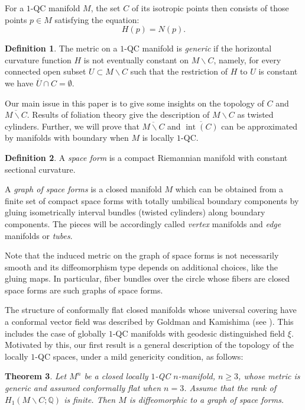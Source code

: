 \documentclass[JEP,XML,SOM,Unicode]{cedram}
\let\moins\smallsetminus
\DeclareMathOperator{\inte}{int}
\newtheorem{theorem}{Theorem}[section]
\theoremstyle{definition}
\newtheorem{definition}[theorem]{Definition}
\theoremstyle{remark}
\numberwithin{equation}{section}
\begin{document}
For a $1$-QC manifold $M$, the set $C$ of its isotropic points
then consists of those points $p\in M$ satisfying the equation:
\[ H(p)=N(p).\]

\begin{definition}\label{generic}
The metric on a $1$-QC manifold is \emph{generic} if the horizontal curvature function $H$
is not eventually constant on $M\moins C$, namely, for every
connected open subset $U\subset M\moins C$ such that the restriction of $H$ to $U$ is constant
we have $\overline{U}\cap C=\emptyset$.
\end{definition}

Our main issue in this paper is to give some insights on the topology of $C$
and $\overline{M\moins C}$. Results of foliation theory give the description of $M\moins C$ as twisted cylinders.
Further, we will prove that $\overline{M\moins C}$
and $\overline{\inte (C)}$ can be approximated by manifolds with boundary when
$M$ is locally $1$-QC.

\begin{definition}
A \emph{space form} is a compact Riemannian manifold with constant sectional curvature.

A \emph{graph of space forms} is a closed manifold $M$ which can be obtained
from a finite set of compact space forms with totally umbilical
boundary components by gluing isometrically
interval bundles (twisted cylinders) along boundary components.
The pieces will be accordingly called \emph{vertex} manifolds and \emph{edge}
manifolds or \emph{tubes}.
\end{definition}

Note that the induced metric on the graph of space forms is not necessarily smooth and its
diffeomorphism type depends on additional choices, like the gluing maps.
In particular, fiber bundles over the circle whose fibers are closed space forms
are such graphs of space forms.

The structure of conformally flat closed manifolds whose universal covering
have a conformal vector field was described by Goldman and Kamishima (see \cite{Go-Kam}).
This includes the case of globally $1$-QC manifolds with geodesic distinguished field $\xi$.
Moti\-vated by this, our first result is a general description of the
topology of the locally $1$-QC spaces, under a mild genericity condition, as follows:

\begin{theorem}\label{arbitrary}
Let $M^n$ be a closed locally $1$-QC $n$-manifold, $n\geq3$, whose metric is generic and
assumed conformally flat when $n=3$. Assume that the rank of \hbox{$H_1(M\moins C;\mathbb Q)$} is finite.
Then $M$ is diffeomorphic to a graph of space forms.
\end{theorem}
\end{document}
